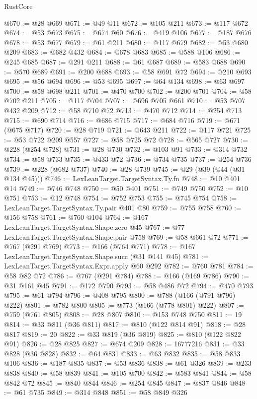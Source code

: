 \begin{lexlean}{RustCore}
\begin{coremodule}
@670 := @28 @669
@671 := @49 @11
@672 := @105 @211
@673 := @117 @672
@674 := @53 @673
@675 := @674 @60
@676 := @419 @106
@677 := @187 @676
@678 := @53 @677
@679 := @61 @211
@680 := @117 @679
@682 := @53 @680 @209
@683 := @682 @432
@684 := @678 @683
@685 := @588 @106
@686 := @245 @685
@687 := @291 @211
@688 := @61 @687
@689 := @583 @688
@690 := @570 @689
@691 := @200 @688
@693 := @58 @691 @72
@694 := @210 @693
@695 := @56 @694
@696 := @53 @695
@697 := @64 @134
@698 := @63 @697
@700 := @58 @698 @211
@701 := @470 @700
@702 := @200 @701
@704 := @58 @702 @211
@705 := @117 @704
@707 := @696 @705 @661
@710 := @53 @707 @432 @209
@712 := @58 @710 @72
@713 := @470 @712
@714 := @254 @713
@715 := @690 @714
@716 := @686 @715
@717 := @684 @716
@719 := @671 (@675 @717)
@720 := @28 @719
@721 := @643 @211
@722 := @117 @721
@725 := @53 @722 @209 @557
@727 := @58 @725 @72
@728 := @565 @727
@730 := @228 (@254 @728)
@731 := @28 @730
@732 := @103 @91
@733 := @314 @732
@734 := @58 @733
@735 := @433 @72
@736 := @734 @735
@737 := @254 @736
@739 := @228 (@682 @737)
@740 := @28 @739
@745 := @29 (@39 (@44 (@31 @134 @45)))
@746 := LexLeanTarget.TargetSyntax.Ty.fn
@748 := @10 @401 @14
@749 := @746 @748
@750 := @50 @401
@751 := @749 @750
@752 := @10 @751
@753 := @12 @748
@754 := @752 @753
@755 := @745 @754
@758 := LexLeanTarget.TargetSyntax.Ty.pair @401 @80
@759 := @755 @758
@760 := @156 @758
@761 := @760 @104
@764 := @167 LexLeanTarget.TargetSyntax.Shape.zero @45
@767 := @77 LexLeanTarget.TargetSyntax.Shape.pair @758
@769 := @58 @661 @72
@771 := @767 (@291 @769)
@773 := @166 (@764 @771)
@778 := @167 LexLeanTarget.TargetSyntax.Shape.succ (@31 @141 @45)
@781 := LexLeanTarget.TargetSyntax.Expr.apply @60 @292
@782 := @760 @781
@784 := @58 @82 @72
@786 := @767 (@291 @784)
@788 := @166 (@169 @786)
@790 := @31 @161 @45
@791 := @172 @790
@793 := @58 @486 @72
@794 := @470 @793
@795 := @61 @794
@796 := @408 @795
@800 := @788 (@166 (@791 @796) @222)
@801 := @782 @800
@805 := @773 (@166 (@778 @801) @222)
@807 := @759 (@761 @805)
@808 := @28 @807
@810 := @153 @748 @750
@811 := 19
@814 := @33 @811 (@36 @811)
@817 := @810 (@122 @814 @91)
@818 := @28 @817
@819 := 20
@822 := @33 @819 (@36 @819)
@825 := @810 (@122 @822 @91)
@826 := @28 @825
@827 := @674 @209
@828 := 16777216
@831 := @33 @828 (@36 @828)
@832 := @64 @831
@833 := @63 @832
@835 := @58 @833 @106
@836 := @187 @835
@837 := @53 @836
@838 := @61 @326
@839 := @233 @838
@840 := @58 @839
@841 := @105 @700
@842 := @583 @841
@844 := @58 @842 @72
@845 := @840 @844
@846 := @254 @845
@847 := @837 @846
@848 := @61 @735
@849 := @314 @848
@851 := @58 @849 @326

\end{coremodule}
\end{lexlean}
